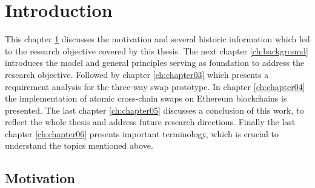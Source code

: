 %
%
\chapter{Introduction}
\label{ch:intro}
This chapter \ref{ch:intro} discusses the motivation and several historic information which led to the research objective covered by this thesis. The next chapter \ref{ch:background} introduces the model and general principles serving as foundation to address the research objective. Followed by chapter \ref{ch:chapter03} which presents a requirement analysis for the three-way swap prototype. In chapter \ref{ch:chapter04} the implementation of atomic cross-chain swaps on Ethereum blockchains is presented. The last chapter \ref{ch:chapter05} discusses a conclusion of this work, to reflect the whole thesis and address future research directions. Finally the last chapter \ref{ch:chapter06} presents important terminology, which is crucial to understand the topics mentioned above.

%
%
\section{Motivation}
\label{sec:intro:motivation}






%
%
